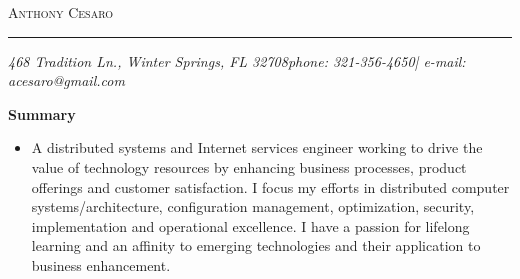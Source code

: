 \documentclass[10pt,oneside]{article}
\makeatletter
\newcommand{\name}{Anthony Cesaro}
\newcommand{\email}{acesaro@gmail.com}
\newcommand{\addr}{468 Tradition Ln., Winter Springs, FL 32708}
\newcommand{\phone}{321-356-4650}
\newcommand{\bigname}[1]{
  \begin{flushleft}\selectfont\Large\scshape#1\end{flushleft}
}
\newenvironment{ressection}[1]{
  \vspace{4pt}
  \textbf{\selectfont\normalsize#1}
  \begin{itemize}
  \vspace{3pt}
}{
  \end{itemize}
}
\newcommand{\resitem}[1]{
  \vspace{-4pt}
  \item \begin{flushleft} #1 \end{flushleft}
}
\makeatother
\begin{document}
 \selectfont

\bigname{\name}

\vspace{-8pt} \rule{\textwidth}{1pt}

\vspace{-1pt} {\small\itshape \addr \hfill phone: \phone | e-mail: \email}

\vspace{8 pt}


\begin{ressection}{Summary}

  \resitem{A distributed systems and Internet services engineer working to drive the value of technology resources by enhancing business processes, product offerings and customer satisfaction. I focus my efforts in distributed computer systems/architecture, configuration management, optimization, security, implementation and operational excellence. I have a passion for lifelong learning and an affinity to emerging technologies and their application to business enhancement.}

\end{ressection}

\end{document}
